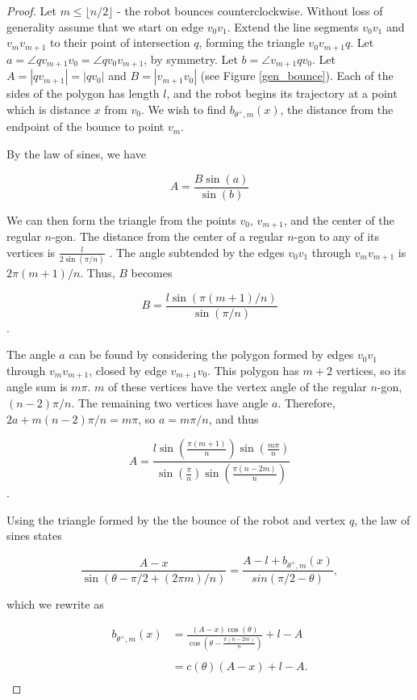 \documentclass[letterpaper, 10 pt, conference]{ieeeconf}  %
\begin{document}
\begin{proof}
Let $m \leq \lfloor n/2 \rfloor$ - the robot bounces counterclockwise.
Without loss of generality assume that we start on edge $v_0 v_1$.
Extend the line segments $v_0 v_1$ and $v_m v_{m+1}$ to their point of
intersection $q$, forming the triangle $v_0 v_{m+1} q$. Let $a = \angle q
v_{m+1} v_0 = \angle q v_0 v_{m+1}$, by symmetry. Let $b = \angle v_{m+1} q
v_0$. Let $A = |q v_{m+1}| = |q v_0|$ and $B = |v_{m+1} v_0|$ (see Figure
\ref{gen_bounce}). Each of the sides of the polygon has length $l$, and the robot
begins its trajectory at a point which is distance $x$ from $v_0$. We wish to
find $b_{\theta^+,m}(x)$, the distance from the endpoint of the bounce to point
$v_m$.

By the law of sines, we have

$$ A = \frac{B \sin(a)}{\sin(b)} $$

\noindent We can then form the triangle from the points $v_0$, $v_{m+1}$, and the center
of the regular $n$-gon. The distance from the center of a regular $n$-gon to any
of its vertices is $\frac{l}{2 \sin(\pi/n)}$ \cite{johnson1929}. The angle subtended
by the edges $v_0 v_1$ through $v_m v_{m+1}$ is $2 \pi (m+1)/n$. Thus, $B$
becomes

$$ B = \frac{l \sin( \pi (m+1) /n)}{\sin (\pi / n)} $$.

The angle $a$ can be found by considering the polygon formed by edges $v_0 v_1$
through $v_m v_{m+1}$, closed by edge $v_{m+1} v_0$. This polygon has $m+2$
vertices, so its angle sum is $m \pi$. $m$ of these vertices have the vertex
angle of the regular $n$-gon, $(n-2) \pi /n$. The remaining two vertices have
angle $a$. Therefore, $2a + m(n-2)\pi/n = m \pi$, so $a = m \pi / n$, and thus 

$$ A = \frac{l \sin(\frac{\pi(m+1)}{n}) \sin( \frac{m \pi}{n} )}{ \sin(
\frac{\pi}{n} ) \sin( \frac{\pi(n-2m)}{n} ) } $$.

Using the triangle formed by the the bounce of the robot and vertex $q$,
the law of sines states

$$ \frac{A-x}{\sin( \theta - \pi/2 + (2 \pi m)/n )} = \frac{ A - l +
b_{\theta^+,m}(x)}{sin(\pi/2 - \theta)}, $$

\noindent which we rewrite as

\begin{align*}
b_{\theta^+,m}(x) & =\frac{(A-x) \cos(\theta)}{\cos(\theta - \frac{\pi
(n-2m)}{n})} + l -A \\ \\
                & = c(\theta)(A-x)  + l -A. \\
\end{align*}
\end{proof}
\end{document}
